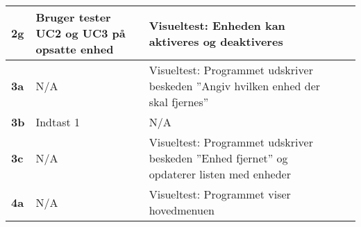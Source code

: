 \begin{center}
\begin{longtable}{|p{}|p{}|p{}|p{}|p{}|}
\textbf{2g} &
Bruger tester UC2 og UC3 på opsatte enhed &
Visueltest: Enheden kan aktiveres og deaktiveres &
 &
 \\\hline

\textbf{3a} &
N/A &
Visueltest: Programmet udskriver beskeden ''Angiv hvilken enhed der skal fjernes'' &
 &
 \\\hline

\textbf{3b} & 
Indtast 1 &
N/A &
 &\\\hline

\textbf{3c} & 
N/A &
Visueltest: Programmet udskriver beskeden ''Enhed fjernet'' og opdaterer listen med enheder &
 &\\\hline

\textbf{4a} & 
N/A &
Visueltest: Programmet viser hovedmenuen &
 &\\\hline

	\end{longtable}
	\label{ATUC8} 
\end{center}